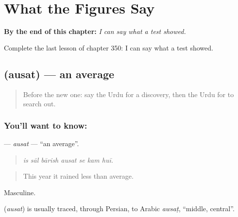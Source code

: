 
\chapter{What the Figures Say}
\label{ch:ur-what-the-figures-say}

\begin{chapteropening}
\textbf{By the end of this chapter:} \emph{I can say what a test showed.}

Complete the last lesson of chapter 350: I can say what a test showed.
\end{chapteropening}

\section[\texorpdfstring{\ur{اوسط} (ausat)}{اوسط (ausat)}]{ (ausat) — an average}

\label{lesson:UR-C350-ausat}



\begin{quote}
Before the new one: say the Urdu for a discovery, then the Urdu for to search out.
\end{quote}

\subsection*{You'll want to know: }
\textbf{} — \emph{ausat} — \textquotedblleft{}an average\textquotedblright{}.

\begin{quote}
      
\end{quote}

\begin{quote}
\emph{is sāl bārish ausat se kam huī.}
\end{quote}

\begin{quote}
This year it rained less than average.
\end{quote}

Masculine.

\begin{cousinweb}
\textbf{} (\emph{ausat}) is usually traced, through Persian, to Arabic \emph{awsaṭ}, \textquotedblleft{}middle, central\textquotedblright{}.
\end{cousinweb}

